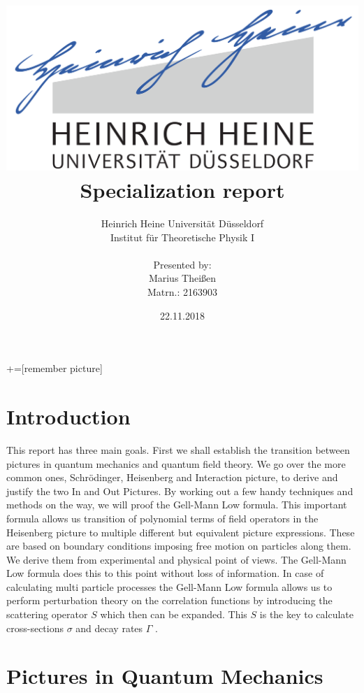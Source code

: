 \documentclass[12pt, titlepage]{article}
\title{\includegraphics[scale=0.07]{logo}\\Specialization report}
\date{22.11.2018}
\author{ Heinrich Heine Universit\"at D\"usseldorf\\ Institut f\"ur Theoretische Physik I\\  \\Presented by:\\Marius Thei\ss{}en\\ Matrn.: 2163903 \\  }
\begin{document}
+=[remember picture]
\everymath{\displaystyle}

\maketitle %
\tableofcontents
\newpage
\section{Introduction}
This report has three main goals. First we shall establish the transition between pictures in quantum mechanics and quantum field theory. We go over the more common ones, Schrödinger, Heisenberg and Interaction picture, to derive and justify the two In and Out Pictures.
By working out a few handy techniques and methods on the way, we will proof the Gell-Mann Low formula. This important formula allows us transition of polynomial terms of field operators in the Heisenberg picture to multiple different but equivalent picture expressions. These are based on boundary conditions imposing free motion on particles along them. We derive them from experimental and physical point of views. The Gell-Mann Low formula does this to this point without loss of information. In case of calculating multi particle processes the Gell-Mann Low formula allows us to perform perturbation theory on the correlation functions by introducing the scattering operator $ S $ which then can be expanded. This  $ S $ is the key to calculate cross-sections $ \sigma $ and decay rates $ \Gamma $ .

\section{Pictures in Quantum Mechanics }
\end{document}
